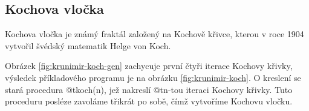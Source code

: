 \subsection{Kochova vločka}

Kochova vločka je známý fraktál založený na Kochově křivce, kterou v roce 1904
vytvořil švédský matematik Helge von Koch. \cite{wiki:koch-snowflake}

Obrázek \ref{fig:krunimir-koch-gen} zachycuje první čtyři iterace Kochovy
křivky, výsledek příkladového programu je na obrázku \ref{fig:krunimir-koch}. O
kreslení se stará procedura @t{koch(n)}, jež nakreslí @t{n}-tou iteraci Kochovy
křivky. Tuto proceduru posléze zavoláme třikrát po sobě, čímž vytvoříme Kochovu
vločku.



